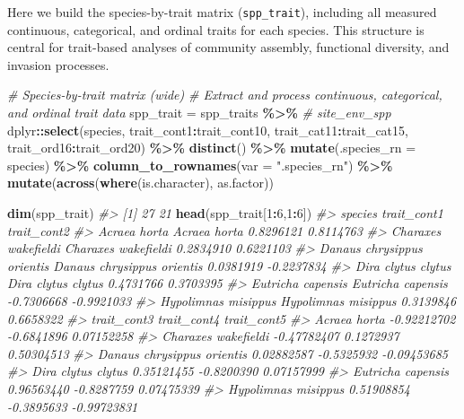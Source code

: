 \documentclass[
]{article}
\newenvironment{Shaded}{\begin{snugshade}}{\end{snugshade}}
\newcommand{\AttributeTok}[1]{\textcolor[rgb]{0.13,0.29,0.53}{#1}}
\newcommand{\CommentTok}[1]{\textcolor[rgb]{0.56,0.35,0.01}{\textit{#1}}}
\newcommand{\DecValTok}[1]{\textcolor[rgb]{0.00,0.00,0.81}{#1}}
\newcommand{\FunctionTok}[1]{\textcolor[rgb]{0.13,0.29,0.53}{\textbf{#1}}}
\newcommand{\NormalTok}[1]{#1}
\newcommand{\OtherTok}[1]{\textcolor[rgb]{0.56,0.35,0.01}{#1}}
\newcommand{\SpecialCharTok}[1]{\textcolor[rgb]{0.81,0.36,0.00}{\textbf{#1}}}
\newcommand{\StringTok}[1]{\textcolor[rgb]{0.31,0.60,0.02}{#1}}
\begin{document}
Here we build the species-by-trait matrix (\texttt{spp\_trait}),
including all measured continuous, categorical, and ordinal traits for
each species. This structure is central for trait-based analyses of
community assembly, functional diversity, and invasion processes.

\begin{Shaded}
\begin{Highlighting}[]
\CommentTok{\# Species{-}by{-}trait matrix (wide)}
\CommentTok{\# Extract and process continuous, categorical, and ordinal trait data}
\NormalTok{spp\_trait }\OtherTok{=}\NormalTok{ spp\_traits }\SpecialCharTok{\%\textgreater{}\%} \CommentTok{\# site\_env\_spp}
\NormalTok{  dplyr}\SpecialCharTok{::}\FunctionTok{select}\NormalTok{(species, trait\_cont1}\SpecialCharTok{:}\NormalTok{trait\_cont10, }
\NormalTok{                trait\_cat11}\SpecialCharTok{:}\NormalTok{trait\_cat15, }
\NormalTok{                trait\_ord16}\SpecialCharTok{:}\NormalTok{trait\_ord20) }\SpecialCharTok{\%\textgreater{}\%}
  \FunctionTok{distinct}\NormalTok{() }\SpecialCharTok{\%\textgreater{}\%}
  \FunctionTok{mutate}\NormalTok{(}\AttributeTok{.species\_rn =}\NormalTok{ species) }\SpecialCharTok{\%\textgreater{}\%}
  \FunctionTok{column\_to\_rownames}\NormalTok{(}\AttributeTok{var =} \StringTok{".species\_rn"}\NormalTok{) }\SpecialCharTok{\%\textgreater{}\%}
  \FunctionTok{mutate}\NormalTok{(}\FunctionTok{across}\NormalTok{(}\FunctionTok{where}\NormalTok{(is.character), as.factor))}

\FunctionTok{dim}\NormalTok{(spp\_trait)}
\CommentTok{\#\textgreater{} [1] 27 21}
\FunctionTok{head}\NormalTok{(spp\_trait[}\DecValTok{1}\SpecialCharTok{:}\DecValTok{6}\NormalTok{,}\DecValTok{1}\SpecialCharTok{:}\DecValTok{6}\NormalTok{])}
\CommentTok{\#\textgreater{}                                               species trait\_cont1 trait\_cont2}
\CommentTok{\#\textgreater{} Acraea horta                             Acraea horta   0.8296121   0.8114763}
\CommentTok{\#\textgreater{} Charaxes wakefieldi               Charaxes wakefieldi   0.2834910   0.6221103}
\CommentTok{\#\textgreater{} Danaus chrysippus orientis Danaus chrysippus orientis   0.0381919  {-}0.2237834}
\CommentTok{\#\textgreater{} Dira clytus clytus                 Dira clytus clytus   0.4731766   0.3703395}
\CommentTok{\#\textgreater{} Eutricha capensis                   Eutricha capensis  {-}0.7306668  {-}0.9921033}
\CommentTok{\#\textgreater{} Hypolimnas misippus               Hypolimnas misippus   0.3139846   0.6658322}
\CommentTok{\#\textgreater{}                            trait\_cont3 trait\_cont4 trait\_cont5}
\CommentTok{\#\textgreater{} Acraea horta               {-}0.92212702  {-}0.6841896  0.07152258}
\CommentTok{\#\textgreater{} Charaxes wakefieldi        {-}0.47782407   0.1272937  0.50304513}
\CommentTok{\#\textgreater{} Danaus chrysippus orientis  0.02882587  {-}0.5325932 {-}0.09453685}
\CommentTok{\#\textgreater{} Dira clytus clytus          0.35121455  {-}0.8200390  0.07157999}
\CommentTok{\#\textgreater{} Eutricha capensis           0.96563440  {-}0.8287759  0.07475339}
\CommentTok{\#\textgreater{} Hypolimnas misippus         0.51908854  {-}0.3895633 {-}0.99723831}
\end{Highlighting}
\end{Shaded}
\end{document}
